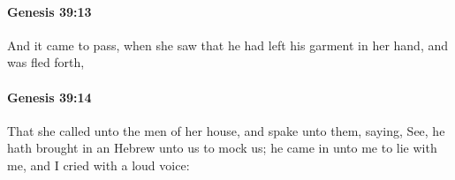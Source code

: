		\paragraph{Genesis 39:13} %
			\label{GENESIS-39-13}

			And it came to pass, when she saw that he had left his garment in her hand, and was fled forth,


		\paragraph{Genesis 39:14} %
			\label{GENESIS-39-14}

			That she called unto the men of her house, and spake unto them, saying, See, he hath brought in an Hebrew unto us to mock us; he came in unto me to lie with me, and I cried with a loud voice:


